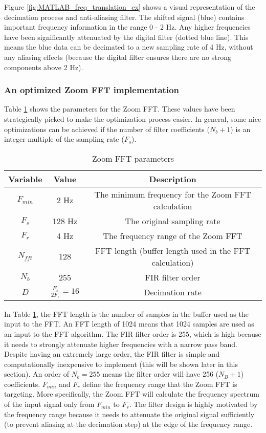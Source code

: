 Figure \ref{fig:MATLAB_freq_translation_ex} shows a visual representation of the decimation process and anti-aliasing filter.  The shifted signal (blue) contains important frequency information in the range 0 - 2 Hz.  Any higher frequencies have been significantly attenuated by the digital filter (dotted blue line).  This means the blue data can be decimated to a new sampling rate of 4 Hz, without any aliasing effects (because the digital filter ensures there are no strong components above 2 Hz).



\subsubsection{An optimized Zoom FFT implementation}

Table \ref{t:zoom_fft_parameters} shows the parameters for the Zoom FFT.  These values have been strategically picked to make the optimization process easier.  In general, some nice optimizations can be achieved if the number of filter coefficients ($N_b+1$) is an integer multiple of the sampling rate ($F_s$).

\begin{table}[]
\centering
\caption{Zoom FFT parameters}
\label{t:zoom_fft_parameters}
\vspace*{0.2in}
\begin{tabular}{|c|c|c|}
\rowcolor[HTML]{EFEFEF} 
\hline
\textbf{Variable} & \textbf{Value} & \textbf{Description} \\ \hline
$F_{min}$ & 2 Hz & The minimum frequency for the Zoom FFT calculation\\ \hline
$F_s$ & 128 Hz & The original sampling rate\\ \hline
$F_r$ & 4 Hz & The frequency range of the Zoom FFT\\ \hline
$N_{fft}$ & 128 & FFT length (buffer length used in the FFT calculation)\\ \hline
$N_b$ & 255 & FIR filter order \\ \hline
$D$ & $\frac{F_s}{2 F_r}=16$ & Decimation rate \\ \hline
\end{tabular}
\end{table}

In Table \ref{t:zoom_fft_parameters}, the FFT length is the number of samples in the buffer used as the input to the FFT. An FFT length of 1024 means that 1024 samples are used as an input to the FFT algorithm.  The FIR filter order is 255, which is high because it needs to strongly attenuate higher frequencies with a narrow pass band.  Despite having an extremely large order, the FIR filter is simple and computationally inexpensive to implement (this will be shown later in this section).  An order of $N_b=255$ means the filter order will have 256 ($N_B+1$) coefficients.  $F_{min}$ and $F_r$ define the frequency range that the Zoom FFT is targeting.  More specifically, the Zoom FFT will calculate the frequency spectrum of the input signal only from $F_{min}$ to $F_{r}$.  The filter design is highly motivated by the frequency range because it needs to attenuate the original signal sufficiently (to prevent aliasing at the decimation step) at the edge of the frequency range.

